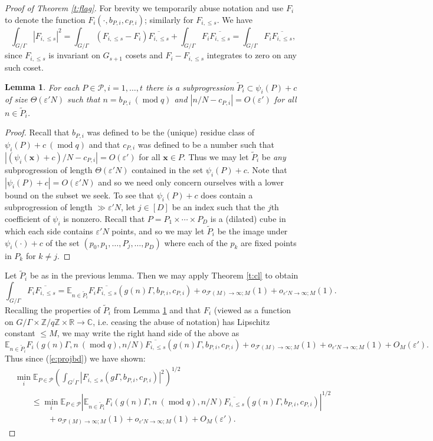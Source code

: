 \documentclass[10pt]{article}
\def\cF{\mathcal{F}}
\def\cP{\mathcal{P}}
\def\eps{\varepsilon}
\def\Z{\mathbb{Z}}
\def\R{\mathbb{R}}
\def\C{\mathbb{C}}
\def\E{\mathbb{E}}
\DeclareMathOperator\mo{mod}
\newcommand{\vect}[1]{\boldsymbol{#1}}
\newtheorem{lemma}[firstthm]{Lemma}
\begin{document}
\begin{proof}[Proof of Theorem \ref{t:flag}]
For brevity we temporarily abuse notation and use $F_{i}$ to denote the function $F_i(\cdot, b_{P,i},c_{P,i})$; similarly for  $F_{i,\leq s}$. We have 
\[\int_{G/\Gamma} |F_{i,\leq s}|^2 = \int_{G/\Gamma}(F_{i,\leq s} - F_i)\overline{F_{i,\leq s}} + \int_{G/\Gamma}F_i\overline{F_{i,\leq s}} = \int_{G/\Gamma}  F_i\overline{F_{i,\leq s}}, \] 
since $F_{i,\leq s}$ is invariant on $G_{s+1}$ cosets and $F_i-F_{i,\leq s}$ integrates to zero on any such coset. 

\begin{lemma}\label{l:tildeP}
For each $P \in \cP, i=1,\ldots, t$ there is a subprogression $\tilde P_i \subset \psi_i(P)+c$ of size  $\Theta(\eps' N)$ such that $n  = b_{P,i} \ (\mo q)$ and $|n/N - c_{P,i}|=O(\eps')$ for all $n \in \tilde P_i$.
\end{lemma}
\begin{proof}
Recall that $b_{P,i}$ was defined to be the (unique) residue class of $\psi_i(P) + c \ (\mo q)$ and that $c_{P,i}$ was defined to be a number such that $|(\psi_i(\vect x) + c)/N-c_{P,i}| = O(\eps')$ for all $\vect x \in P$.  Thus we may let $\tilde P_i$ be \textit{any} subprogression of length $\Theta(\eps' N)$ contained in the set $\psi_i(P)+c$. Note that $|\psi_i(P) + c| = O(\eps'N)$ and so we need only concern ourselves with a lower bound on the subset we seek. To see that $\psi_i(P)+c$ does contain a subprogression of length $\gg \eps' N$, let $j\in [D]$ be an index such that the $j$th coefficient of $\psi_i$ is nonzero. Recall that $P=P_1 \times \cdots \times P_D$ is a (dilated) cube in which each side contains $\eps' N$ points, and so we may let $\tilde P_i$ be the image under $\psi_i(\cdot) + c$ of the set $(p_0,p_1,\ldots, P_j, \ldots, p_D)$ where each of the $p_k$ are fixed points in $P_k$ for $k \ne j$.
\end{proof}

Let $\tilde P_i$ be as in the previous lemma. Then we may apply Theorem \ref{t:cl} to obtain 
\[ \int_{G/\Gamma}  F_i\overline{F_{i,\leq s}} = \E_{n\in \tilde P_i} F_i\overline{F_{i,\leq s}}( g(n) \Gamma, b_{P,i},c_{P,i}) + o_{\cF(M) \to \infty ; M}(1) + o_{\eps'N\to \infty;M}(1). \]
Recalling the properties of $\tilde P_i$ from Lemma \ref{l:tildeP} and that $F_i$ (viewed as a function on $G/\Gamma \times  \Z/q\Z \times \R \to \C$, i.e. ceasing the abuse of notation) has Lipschitz constant $\leq M$, we may write the right hand side of the above as 
\[ \E_{n\in \tilde P_i} F_i( g(n) \Gamma, n \ (\mo q), n/N)\overline{F_{i,\leq s}}( g(n) \Gamma, b_{P,i},c_{P,i}) + o_{\cF(M) \to \infty ; M}(1) + o_{\eps'N\to \infty;M}(1) + O_M(\eps'). \]
Thus since (\ref{e:projbd}) we have shown: 
\begin{align}\label{e:progAgain}
 & \min_i \E_{P\in \cP} \left(\int_{G^/\Gamma} |F_{i,\leq s}(g\Gamma, b_{P,i}, c_{P,i})|^2\right)^{1/2} \nonumber \\ &\qquad \leq \min_i \E_{P \in \cP}\left|\E_{n\in \tilde P_i} F_i( g(n) \Gamma, n \ (\mo q), n/N)\overline{F_{i,\leq s}}( g(n) \Gamma, b_{P,i},c_{P,i})\right|^{1/2}\\ \nonumber
 & \qquad \qquad + o_{\cF(M) \to \infty ; M}(1) + o_{\eps'N\to \infty;M}(1) + O_M(\eps').
\end{align}



\end{proof}
\end{document}
